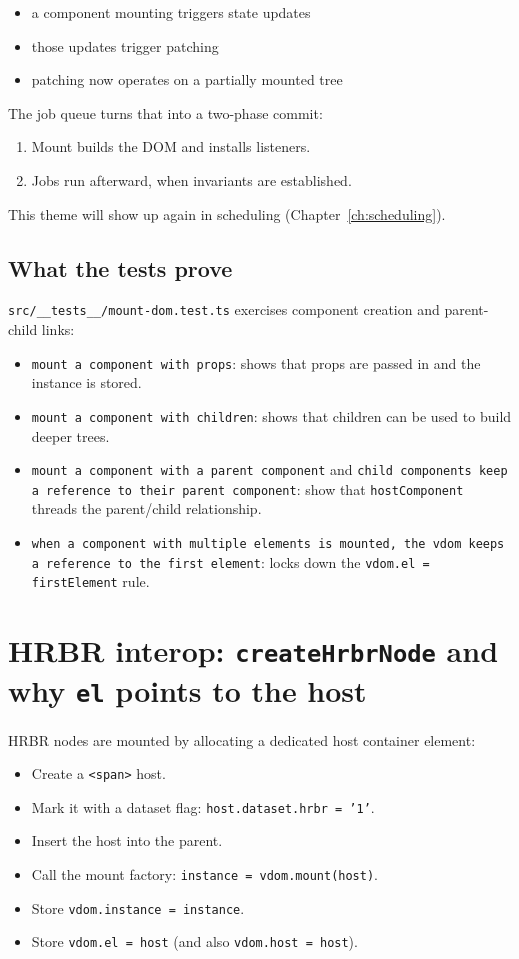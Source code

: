 \begin{itemize}
  \item a component mounting triggers state updates
  \item those updates trigger patching
  \item patching now operates on a partially mounted tree
\end{itemize}

The job queue turns that into a two-phase commit:

\begin{enumerate}
  \item Mount builds the DOM and installs listeners.
  \item Jobs run afterward, when invariants are established.
\end{enumerate}

This theme will show up again in scheduling (Chapter~\ref{ch:scheduling}).

\subsection*{What the tests prove}
  	\texttt{src/\_\_tests\_\_/mount-dom.test.ts} exercises component creation and parent-child links:

\begin{itemize}
  \item \texttt{mount a component with props}: shows that props are passed in and the instance is stored.
  \item \texttt{mount a component with children}: shows that children can be used to build deeper trees.
  \item \texttt{mount a component with a parent component} and \texttt{child components keep a reference to their parent component}: show that \texttt{hostComponent} threads the parent/child relationship.
  \item \texttt{when a component with multiple elements is mounted, the vdom keeps a reference to the first element}: locks down the \texttt{vdom.el = firstElement} rule.
\end{itemize}

\section{HRBR interop: \texttt{createHrbrNode} and why \texttt{el} points to the host}
HRBR nodes are mounted by allocating a dedicated host container element:

\begin{itemize}
  \item Create a \texttt{<span>} host.
  \item Mark it with a dataset flag: \texttt{host.dataset.hrbr = '1'}.
  \item Insert the host into the parent.
  \item Call the mount factory: \texttt{instance = vdom.mount(host)}.
  \item Store \texttt{vdom.instance = instance}.
  \item Store \texttt{vdom.el = host} (and also \texttt{vdom.host = host}).
\end{itemize}

